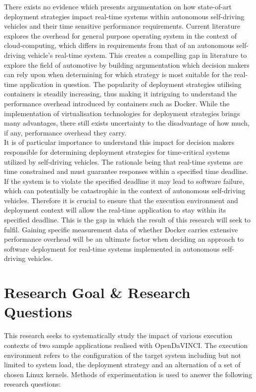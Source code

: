 There exists no evidence which presents argumentation on how state-of-art deployment strategies impact real-time systems within autonomous self-driving vehicles and their time sensitive performance requirements. Current literature \cite{vmvscontainers} explores the overhead for general purpose operating system in the context of cloud-computing, which differs in requirements from that of an autonomous self-driving vehicle's real-time system. This creates a compelling gap in literature to explore the field of automotive by building argumentation which decision makers can rely upon when determining for which strategy is most suitable for the real-time application in question. The popularity of deployment strategies utilising containers is steadily increasing, thus making it intriguing to understand the performance overhead introduced by containers such as Docker. While the implementation of virtualisation technologies for deployment strategies brings many advantages, there still exists uncertainty to the disadvantage of how much, if any, performance overhead they carry.\\

It is of particular importance to understand this impact for decision makers responsible for determining deployment strategies for time-critical systems utilized by self-driving vehicles. The rationale being that real-time systems are time constrained and must guarantee responses within a specified time deadline. If the system is to violate the specified deadline it may lead to software failure, which can potentially be catastrophic in the context of autonomous self-driving vehicles. Therefore it is crucial to ensure that the execution environment and deployment context will allow the real-time application to stay within its specified deadline. This is the gap in which the result of this research will seek to fulfil. Gaining specific measurement data of whether Docker carries extensive performance overhead will be an ultimate factor when deciding an approach to software deployment for real-time systems implemented in autonomous self-driving vehicles.\\

\section{Research Goal \& Research Questions}
This research seeks to systematically study the impact of various execution contexts of two sample applications realised with OpenDaVINCI. The execution environment refers to the configuration of the target system including but not limited to system load, the deployment strategy and an alternation of a set of chosen Linux kernels. Methods of experimentation is used to answer the following research questions:\\

